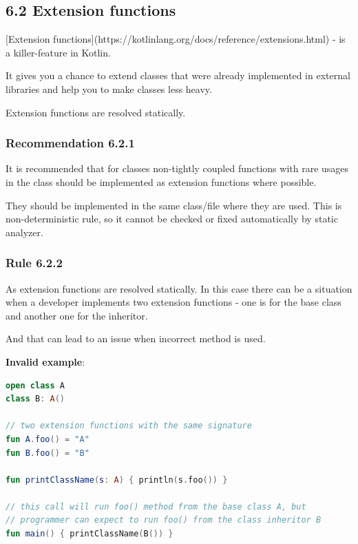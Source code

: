 {{{{\subsection*{\textbf{6.2 Extension functions}}

[Extension functions](https://kotlinlang.org/docs/reference/extensions.html) - is a killer-feature in Kotlin. 

It gives you a chance to extend classes that were already implemented in external libraries and help you to make classes less heavy.

Extension functions are resolved statically.



\subsubsection*{\textbf{Recommendation 6.2.1}}
\leavevmode\newline

It is recommended that for classes non-tightly coupled functions with rare usages in the class should be implemented as extension functions where possible.

They should be implemented in the same class/file where they are used. This is non-deterministic rule, so it cannot be checked or fixed automatically by static analyzer.



\subsubsection*{\textbf{Rule 6.2.2}}
\leavevmode\newline

As extension functions are resolved statically. In this case there can be a situation when a developer implements two extension functions - one is for the base class and another one for the inheritor.

And that can lead to an issue when incorrect method is used. 



\textbf{Invalid example}:

\begin{lstlisting}[language=Kotlin]
open class A
class B: A()

// two extension functions with the same signature
fun A.foo() = "A"
fun B.foo() = "B"

fun printClassName(s: A) { println(s.foo()) }

// this call will run foo() method from the base class A, but
// programmer can expect to run foo() from the class inheritor B
fun main() { printClassName(B()) }
\end{lstlisting}


}}}}
